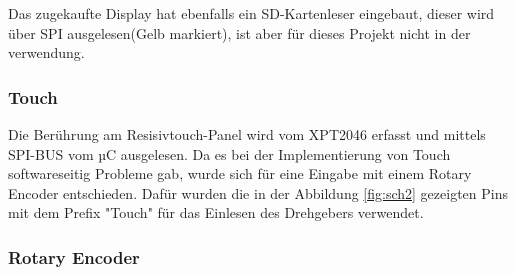         Das zugekaufte Display hat ebenfalls ein SD-Kartenleser eingebaut, dieser wird 
        über SPI ausgelesen(Gelb markiert), ist aber für dieses Projekt nicht in der verwendung. 


        \subsubsection{Touch}
        Die Berührung am Resisivtouch-Panel wird vom XPT2046 erfasst und mittels 
        SPI-BUS vom µC ausgelesen. Da es bei der Implementierung von Touch softwareseitig
        Probleme gab, wurde sich für eine Eingabe mit einem Rotary Encoder entschieden.
        Dafür wurden die in der Abbildung \ref{fig:sch2} gezeigten Pins mit dem Prefix "Touch" 
        für das Einlesen des Drehgebers verwendet.

        \subsubsection{Rotary Encoder}
